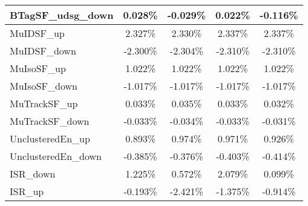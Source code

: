 \begin{table}[]
{\begin{tabular}{|l|c|c|c|c|}
BTagSF\_udsg\_down                          & 0.028\%                           & -0.029\%                           & 0.022\%                          & -0.116\%                           \\ \hline     
MuIDSF\_up                             & 2.327\%                              & 2.330\%                              & 2.337\%                             & 2.337\%                              \\ \hline    
MuIDSF\_down                           & -2.300\%                            & -2.304\%                            & -2.310\%                           & -2.310\%                            \\ \hline    
MuIsoSF\_up                            & 1.022\%                             & 1.022\%                             & 1.022\%                            & 1.022\%                             \\ \hline           
MuIsoSF\_down                          & -1.017\%                           & -1.017\%                           & -1.017\%                          & -1.017\%                           \\ \hline    
MuTrackSF\_up                          & 0.033\%                           & 0.035\%                           & 0.033\%                          & 0.032\%                           \\ \hline    
MuTrackSF\_down                        & -0.033\%                         & -0.034\%                         & -0.033\%                        & -0.031\%                         \\ \hline  
UnclusteredEn\_up                         & 0.893\%                          & 0.974\%                          & 0.971\%                         & 0.926\%                          \\ \hline    
UnclusteredEn\_down                      & -0.385\%                         & -0.376\%                        & -0.403\%                       & -0.414\%                        \\ \hline   \hline 
ISR\_down                                & 1.225\%                                   & 0.572\%                                  & 2.079\%                                 & 0.099\%                                  \\ \hline
ISR\_up                                  & -0.193\%                                     & -2.421\%                                    & -1.375\%                                   & -0.914\%                                    \\ \hline

\end{tabular}}
\end{table}

